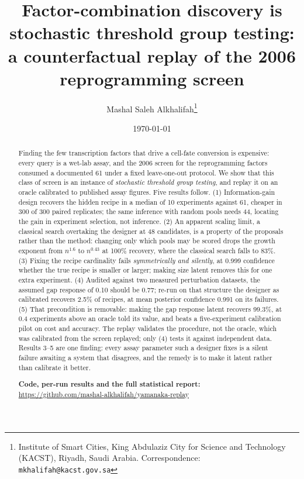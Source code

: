 \documentclass[10pt]{article}
\title{\textbf{Factor-combination discovery is stochastic threshold group
testing: a counterfactual replay of the 2006 reprogramming screen}}
\author{Mashal Saleh Alkhalifah\thanks{Institute of Smart Cities, King
Abdulaziz City for Science and Technology (KACST), Riyadh, Saudi Arabia.
Correspondence: \texttt{mkhalifah@kacst.gov.sa}}}
\date{\today}
\begin{document}
\maketitle
\thispagestyle{empty}
\begin{abstract}
\noindent
Finding the few transcription factors that drive a cell-fate conversion is
expensive: every query is a wet-lab assay, and the 2006 screen for the
reprogramming factors consumed a documented 61 under a fixed leave-one-out
protocol. We show that this class of screen is an instance of \emph{stochastic
threshold group testing}, and replay it on an oracle calibrated to published
assay figures. Five results follow. (1) Information-gain design recovers the
hidden recipe in a median of 10 experiments against 61, cheaper in 300 of 300
paired replicates; the same inference with random pools needs 44, locating the
gain in experiment selection, not inference. (2) An apparent scaling limit, a
classical search overtaking the designer at 48 candidates, is a property of
the proposals rather than the method: changing only which pools may be scored
drops the growth exponent from $n^{1.6}$ to $n^{0.43}$ at 100\% recovery,
where the classical search falls to 83\%. (3) Fixing the recipe cardinality
fails \emph{symmetrically and silently}, at 0.999 confidence whether the true
recipe is smaller or larger; making size latent removes this for one extra
experiment. (4) Audited against two measured perturbation datasets, the
assumed gap response of 0.10 should be 0.77; re-run on that structure the
designer as calibrated recovers 2.5\% of recipes, at mean posterior confidence
0.991 on its failures. (5) That precondition is removable: making the gap
response latent recovers 99.3\%, at 0.4 experiments above an oracle told its
value, and beats a five-experiment calibration pilot on cost and accuracy. The
replay validates the procedure, not the oracle, which was calibrated from the
screen replayed; only (4) tests it against independent data. Results 3--5 are
one finding: every assay parameter such a designer fixes is a silent failure
awaiting a system that disagrees, and the remedy is to make it latent rather
than calibrate it better.

\medskip
\noindent\textbf{Code, per-run results and the full statistical report:}\\
\url{https://github.com/mashal-alkhalifah/yamanaka-replay}
\end{abstract}
\newpage
\setcounter{page}{1}
\end{document}
